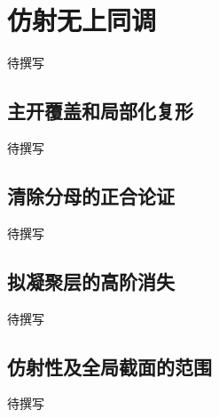 
% 
% 

\section{仿射无上同调}
\label{g5:sec:1803}

待撰写

\subsection{主开覆盖和局部化复形}
\label{g5:subsec:1803:01}
待撰写

\subsection{清除分母的正合论证}
\label{g5:subsec:1803:02}
待撰写

\subsection{拟凝聚层的高阶消失}
\label{g5:subsec:1803:03}
待撰写

\subsection{仿射性及全局截面的范围}
\label{g5:subsec:1803:04}
待撰写
